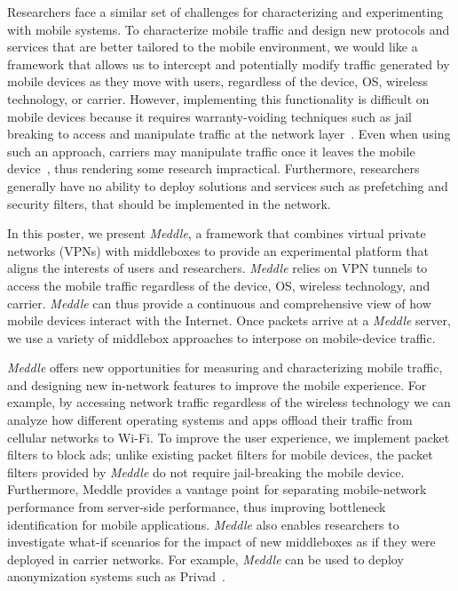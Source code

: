 \documentclass{sig-alternate}
\newcommand{\meddle}{{\em Meddle}\xspace}
\begin{document}
Researchers face a similar set of challenges for characterizing 
and experimenting with mobile systems. To characterize mobile traffic and
design new protocols and services that are better tailored to the
mobile environment, we would like a framework that allows us to
intercept and potentially modify traffic generated by mobile devices
as they move with users, regardless of the device, OS, wireless
technology, or carrier. However, implementing this functionality is
difficult on mobile devices because it requires warranty-voiding
techniques such as jail breaking to access and manipulate traffic at
the network layer~\cite{enck:taintdroid}. Even when using such an
approach, carriers may manipulate traffic once it leaves the mobile
device~\cite{wang:middleboxes}, thus rendering some research
impractical. Furthermore, researchers generally have no ability to 
deploy solutions and services such as prefetching and security
filters, that should be implemented in the network.

In this poster, we present \meddle, a framework that combines virtual
private networks (VPNs) with middleboxes to provide an experimental
platform that aligns the interests of users and researchers. \meddle
relies on VPN tunnels to access the mobile traffic regardless of the
device, OS, wireless technology, and carrier. \meddle can thus provide
a continuous and comprehensive view of how mobile devices interact
with the Internet. Once packets arrive at a \meddle server, we use a
variety of middlebox approaches to interpose on mobile-device
traffic. 

\meddle offers new opportunities for measuring and characterizing
mobile traffic, and designing new in-network features to improve the
mobile experience. For example, by accessing network traffic
regardless of the wireless technology we can analyze how different
operating systems and apps offload their traffic from cellular
networks to Wi-Fi. To improve the user experience, we implement packet
filters to block ads; unlike existing packet filters for mobile
devices, the packet filters provided by \meddle do not require
jail-breaking the mobile device. Furthermore, Meddle provides a
vantage point for separating mobile-network performance from
server-side performance, thus improving bottleneck identification for
mobile applications. \meddle also enables researchers to investigate
what-if scenarios for the impact of new middleboxes as if they were
deployed in carrier networks. For example, \meddle can be used to
deploy anonymization systems such as Privad~\cite{guha:privad}.  
\end{document}
